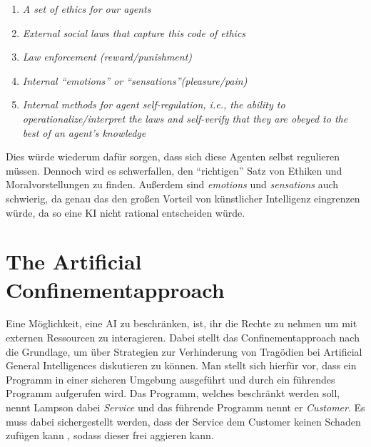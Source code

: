         \begin{enumerate}
            \item \textit{A set of ethics for our agents}
            \item \textit{External social laws that capture this code of ethics}
            \item \textit{Law enforcement (reward/punishment)}
            \item \textit{Internal ``emotions'' or ``sensations''(pleasure/pain)}
            \item \textit{Internal methods for agent self-regulation, i.e., the ability to operationalize/interpret the laws
            and self-verify that they are obeyed to the best of an agent's knowledge}
        \end{enumerate}
        \cite{GordonSpears2003}
        Dies würde wiederum dafür sorgen, dass sich diese Agenten selbst regulieren müssen. Dennoch wird es schwerfallen,
        den ``richtigen'' Satz von Ethiken und Moralvorstellungen zu finden. Außerdem sind \textit{emotions} und
        \textit{sensations} auch schwierig, da genau das den großen Vorteil von künstlicher Intelligenz eingrenzen würde,
        da so eine KI nicht rational entscheiden würde.

    \section{The Artificial Confinementapproach}

        Eine Möglichkeit, eine AI zu beschränken, ist, ihr die Rechte zu nehmen um mit externen Ressourcen zu interagieren.
        Dabei stellt das Confinementapproach nach \cite{lampson1973note} die Grundlage, um über Strategien zur Verhinderung
        von Tragödien bei Artificial General Intelligences diskutieren zu können. Man stellt sich hierfür vor, dass ein
        Programm in einer sicheren Umgebung ausgeführt und durch ein führendes Programm aufgerufen wird. Das Programm,
        welches beschränkt werden soll, nennt Lampson dabei \textit{Service} und das führende Programm nennt er
        \textit{Customer}. Es muss dabei sichergestellt werden, dass der Service dem Customer keinen Schaden zufügen kann
        \cite{lampson1973note}, sodass dieser frei aggieren kann.

